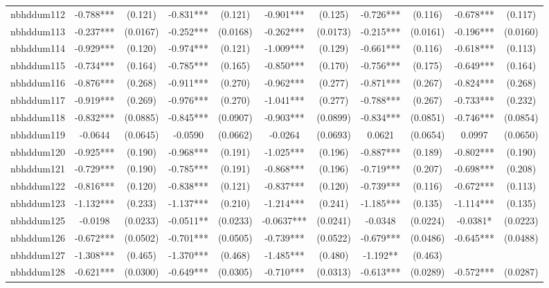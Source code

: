 \documentclass[]{article}
\begin{document}
\begin{tabular}{lcccccccccc}
nbhddum112 & -0.788*** & (0.121) & -0.831*** & (0.121) & -0.901*** & (0.125) & -0.726*** & (0.116) & -0.678*** & (0.117) \\
nbhddum113 & -0.237*** & (0.0167) & -0.252*** & (0.0168) & -0.262*** & (0.0173) & -0.215*** & (0.0161) & -0.196*** & (0.0160) \\
nbhddum114 & -0.929*** & (0.120) & -0.974*** & (0.121) & -1.009*** & (0.129) & -0.661*** & (0.116) & -0.618*** & (0.113) \\
nbhddum115 & -0.734*** & (0.164) & -0.785*** & (0.165) & -0.850*** & (0.170) & -0.756*** & (0.175) & -0.649*** & (0.164) \\
nbhddum116 & -0.876*** & (0.268) & -0.911*** & (0.270) & -0.962*** & (0.277) & -0.871*** & (0.267) & -0.824*** & (0.268) \\
nbhddum117 & -0.919*** & (0.269) & -0.976*** & (0.270) & -1.041*** & (0.277) & -0.788*** & (0.267) & -0.733*** & (0.232) \\
nbhddum118 & -0.832*** & (0.0885) & -0.845*** & (0.0907) & -0.903*** & (0.0899) & -0.834*** & (0.0851) & -0.746*** & (0.0854) \\
nbhddum119 & -0.0644 & (0.0645) & -0.0590 & (0.0662) & -0.0264 & (0.0693) & 0.0621 & (0.0654) & 0.0997 & (0.0650) \\
nbhddum120 & -0.925*** & (0.190) & -0.968*** & (0.191) & -1.025*** & (0.196) & -0.887*** & (0.189) & -0.802*** & (0.190) \\
nbhddum121 & -0.729*** & (0.190) & -0.785*** & (0.191) & -0.868*** & (0.196) & -0.719*** & (0.207) & -0.698*** & (0.208) \\
nbhddum122 & -0.816*** & (0.120) & -0.838*** & (0.121) & -0.837*** & (0.120) & -0.739*** & (0.116) & -0.672*** & (0.113) \\
nbhddum123 & -1.132*** & (0.233) & -1.137*** & (0.210) & -1.214*** & (0.241) & -1.185*** & (0.135) & -1.114*** & (0.135) \\
nbhddum125 & -0.0198 & (0.0233) & -0.0511** & (0.0233) & -0.0637*** & (0.0241) & -0.0348 & (0.0224) & -0.0381* & (0.0223) \\
nbhddum126 & -0.672*** & (0.0502) & -0.701*** & (0.0505) & -0.739*** & (0.0522) & -0.679*** & (0.0486) & -0.645*** & (0.0488) \\
nbhddum127 & -1.308*** & (0.465) & -1.370*** & (0.468) & -1.485*** & (0.480) & -1.192** & (0.463) &  &  \\
nbhddum128 & -0.621*** & (0.0300) & -0.649*** & (0.0305) & -0.710*** & (0.0313) & -0.613*** & (0.0289) & -0.572*** & (0.0287) \\

\end{tabular}
\end{document}
